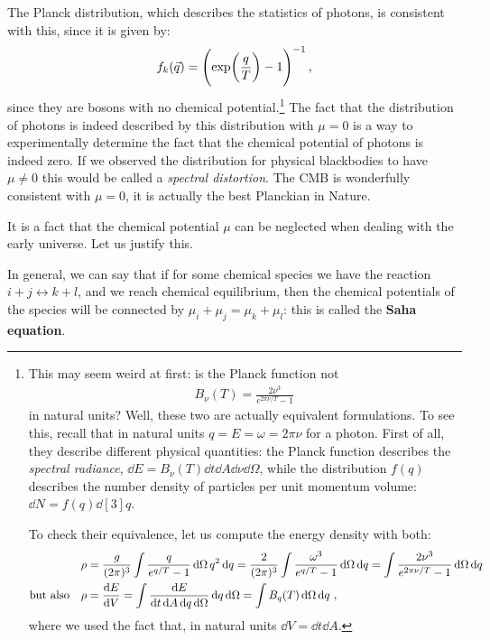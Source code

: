 \documentclass[main.tex]{subfiles}
\begin{document}
The Planck distribution, which describes the statistics of photons, is consistent with this, since it is given by: 
%
\begin{equation}
  f_k(\vec{q}) = \qty(\exp(\frac{q}{T}) -1 )^{-1}
\,,
\end{equation}
%
since they are bosons with no chemical potential.\footnote{This may seem weird at first: is the Planck function not 
%
\begin{align}
B_{\nu } (T) = \frac{2\nu^3}{e^{ 2 \pi \nu / T} -1 }
\,
\end{align}
%
in natural units?
Well, these two are actually equivalent formulations. To see this, recall that in natural units \(q = E = \omega = 2 \pi \nu \) for a photon. First of all, they describe different physical quantities: the Planck function describes the \emph{spectral radiance}, \(\dd{E} = B_\nu (T) \dd{t} \dd{A} \dd{\nu } \dd{\Omega }\), while the distribution \(f(q)\) describes the number density of particles per unit momentum volume: \(\dd{N} = f(q) \dd[3]{q}\).  

To check their equivalence, let us compute the energy density with both: 
%
\begin{align}
\rho &=  \frac{g}{(2\pi )^3} \int \frac{q}{e^{q/T}-1} \dd{\Omega } q^2 \dd{q} = \frac{2}{(2\pi )^3}\int \frac{ \omega^3}{e^{q/T}-1} \dd{\Omega } \dd{q}  
= \int \frac{2 \nu^3}{e^{2 \pi \nu /T}-1} \dd{\Omega } \dd{q}
\\
\text{but also}\quad\rho &= \dv{E}{V} = \int \frac{ \dd{E}}{ \dd{t} \dd{A} \dd{q} \dd{\Omega }} \dd{q} \dd{\Omega } = \int B_q(T) \dd{\Omega } \dd{q}
\,,
\end{align}
%
where we used the fact that, in natural units \(\dd{V} = \dd{t} \dd{A}\).
}
The fact that the distribution of photons is indeed described by this distribution with \(\mu =0\) is a way to experimentally determine the fact that the chemical potential of photons is indeed zero. If we observed the distribution for physical blackbodies to have \(\mu \neq 0\) this would be called a \emph{spectral distortion}. The CMB is wonderfully consistent with \(\mu =0\), it is actually the best Planckian in Nature.

It is a fact that the chemical potential \(\mu \) can be neglected when dealing with the early universe. Let us justify this.

In general, we can say that if for some chemical species we have the reaction \(i+j \leftrightarrow k+l\), and we reach chemical equilibrium, then the chemical potentials of the species will be connected by \(\mu _i + \mu _j = \mu _k + \mu _l\): this is called the \textbf{Saha equation}.
\end{document}
